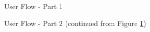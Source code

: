 
\begin{figure}[H]
\centering
\begin{tikzpicture}
\end{tikzpicture}
\caption{User Flow - Part 1}
\label{fig:userflow-part1}
\end{figure}


\begin{figure}[H]
\centering
\begin{tikzpicture}
\end{tikzpicture}
\caption{User Flow - Part 2 (continued from Figure \ref{fig:userflow-part1})}
\label{fig:userflow-part2}
\end{figure}



